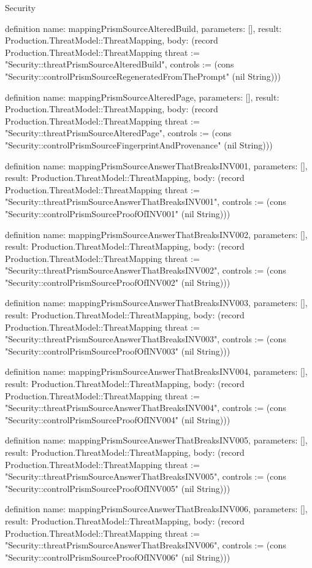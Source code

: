 \begin{lexlean}{Security}
\begin{semanticmodule}
definition{
  name: mappingPrismSourceAlteredBuild,
  parameters: [],
  result: Production.ThreatModel::ThreatMapping,
  body: (record Production.ThreatModel::ThreatMapping {threat := "Security::threatPrismSourceAlteredBuild", controls := (cons "Security::controlPrismSourceRegeneratedFromThePrompt" (nil String))})
}

definition{
  name: mappingPrismSourceAlteredPage,
  parameters: [],
  result: Production.ThreatModel::ThreatMapping,
  body: (record Production.ThreatModel::ThreatMapping {threat := "Security::threatPrismSourceAlteredPage", controls := (cons "Security::controlPrismSourceFingerprintAndProvenance" (nil String))})
}

definition{
  name: mappingPrismSourceAnswerThatBreaksINV001,
  parameters: [],
  result: Production.ThreatModel::ThreatMapping,
  body: (record Production.ThreatModel::ThreatMapping {threat := "Security::threatPrismSourceAnswerThatBreaksINV001", controls := (cons "Security::controlPrismSourceProofOfINV001" (nil String))})
}

definition{
  name: mappingPrismSourceAnswerThatBreaksINV002,
  parameters: [],
  result: Production.ThreatModel::ThreatMapping,
  body: (record Production.ThreatModel::ThreatMapping {threat := "Security::threatPrismSourceAnswerThatBreaksINV002", controls := (cons "Security::controlPrismSourceProofOfINV002" (nil String))})
}

definition{
  name: mappingPrismSourceAnswerThatBreaksINV003,
  parameters: [],
  result: Production.ThreatModel::ThreatMapping,
  body: (record Production.ThreatModel::ThreatMapping {threat := "Security::threatPrismSourceAnswerThatBreaksINV003", controls := (cons "Security::controlPrismSourceProofOfINV003" (nil String))})
}

definition{
  name: mappingPrismSourceAnswerThatBreaksINV004,
  parameters: [],
  result: Production.ThreatModel::ThreatMapping,
  body: (record Production.ThreatModel::ThreatMapping {threat := "Security::threatPrismSourceAnswerThatBreaksINV004", controls := (cons "Security::controlPrismSourceProofOfINV004" (nil String))})
}

definition{
  name: mappingPrismSourceAnswerThatBreaksINV005,
  parameters: [],
  result: Production.ThreatModel::ThreatMapping,
  body: (record Production.ThreatModel::ThreatMapping {threat := "Security::threatPrismSourceAnswerThatBreaksINV005", controls := (cons "Security::controlPrismSourceProofOfINV005" (nil String))})
}

definition{
  name: mappingPrismSourceAnswerThatBreaksINV006,
  parameters: [],
  result: Production.ThreatModel::ThreatMapping,
  body: (record Production.ThreatModel::ThreatMapping {threat := "Security::threatPrismSourceAnswerThatBreaksINV006", controls := (cons "Security::controlPrismSourceProofOfINV006" (nil String))})
}


\end{semanticmodule}
\end{lexlean}
